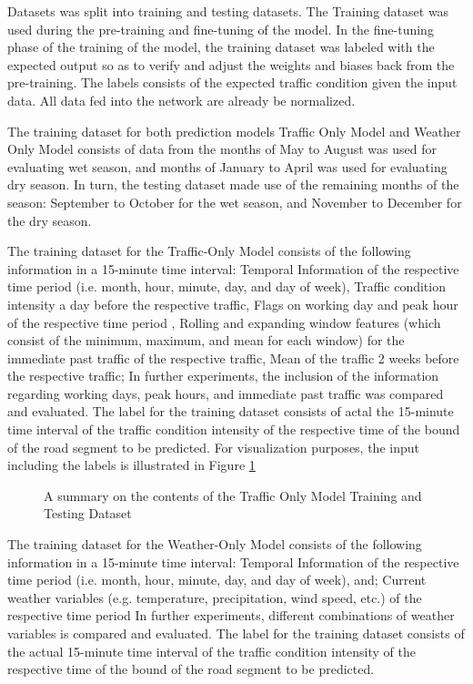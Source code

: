Datasets was split into training and testing datasets. The Training dataset was used during the pre-training and fine-tuning of the model. In the fine-tuning phase of the training of the model, the training dataset was labeled with the expected output so as to verify and adjust the weights and biases back from the pre-training. The labels consists of the expected traffic condition given the input data. All data fed into the network are already be normalized. 

The training dataset for both prediction models Traffic Only Model and Weather Only Model consists of data from the months of May to August was used for evaluating wet season, and months of January to April was used for evaluating dry season. In turn, the testing dataset made use of the remaining months of the season: September to October for the wet season, and November to December for the dry season.  

The training dataset for the Traffic-Only Model consists of the following information in a 15-minute time interval: 
Temporal Information of the respective time period (i.e. month, hour, minute, day, and day of week),
Traffic condition intensity a day before the respective traffic,
Flags on working day and peak hour of the respective time period ,
Rolling and expanding window features (which consist of the minimum, maximum, and mean for each window) for the immediate past traffic of the respective traffic,
Mean of the traffic 2 weeks before the respective traffic;
In further experiments, the inclusion of the information regarding working days, peak hours, and immediate past traffic was compared and evaluated. The label for the training dataset consists of actal the 15-minute time interval of the traffic condition intensity of the respective time of the bound of the road segment to be predicted. For visualization purposes, the input including the labels is illustrated in Figure \ref{fig:TOM_TrainingTestingInput}


\begin{figure}
  \centering
  \captionsetup{justification=centering}
  \caption{A summary on the contents of the Traffic Only Model Training and Testing Dataset}
  \label{fig:TOM_TrainingTestingInput}
\end{figure}


The training dataset for the Weather-Only Model consists of the following information in a 15-minute time interval: 
Temporal Information of the respective time period (i.e. month, hour, minute, day, and day of week), and;
Current weather variables (e.g. temperature, precipitation, wind speed, etc.) of the respective time period
In further experiments, different combinations of weather variables is compared and evaluated. The label for the training dataset consists of the actual 15-minute time interval of the traffic condition intensity of the respective time of the bound of the road segment to be predicted. 

